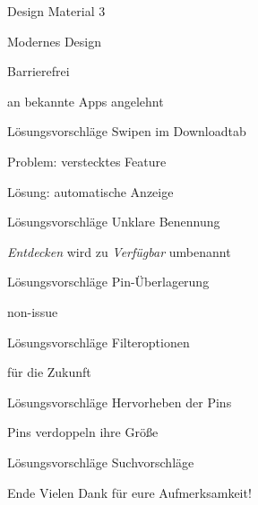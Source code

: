 \documentclass{beamer}
\begin{document}
  \begin{frame}{Design}
    Material 3

    Modernes Design

    Barrierefrei

    an bekannte Apps angelehnt
  \end{frame}
  \begin{frame}{Lösungsvorschläge}
    Swipen im Downloadtab

    Problem: verstecktes Feature

    Lösung: automatische Anzeige
  \end{frame}
  \begin{frame}{Lösungsvorschläge}
    Unklare Benennung

    \emph{Entdecken} wird zu \emph{Verfügbar} umbenannt
  \end{frame}
    \begin{frame}{Lösungsvorschläge}
    Pin-Überlagerung

    non-issue
  \end{frame}
    \begin{frame}{Lösungsvorschläge}
    Filteroptionen

    für die Zukunft
  \end{frame}
    \begin{frame}{Lösungsvorschläge}
    Hervorheben der Pins

    Pins verdoppeln ihre Größe
  \end{frame}
    \begin{frame}{Lösungsvorschläge}
    Suchvorschläge
  \end{frame}
    \begin{frame}{Ende}
    Vielen Dank für eure Aufmerksamkeit!
  \end{frame}
\end{document}
